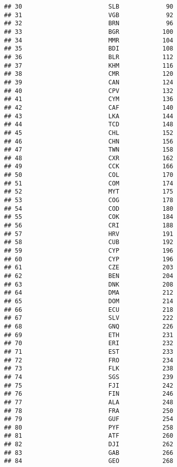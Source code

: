 \documentclass[
]{article}
\begin{document}
\begin{verbatim}
## 30                        SLB             90
## 31                        VGB             92
## 32                        BRN             96
## 33                        BGR            100
## 34                        MMR            104
## 35                        BDI            108
## 36                        BLR            112
## 37                        KHM            116
## 38                        CMR            120
## 39                        CAN            124
## 40                        CPV            132
## 41                        CYM            136
## 42                        CAF            140
## 43                        LKA            144
## 44                        TCD            148
## 45                        CHL            152
## 46                        CHN            156
## 47                        TWN            158
## 48                        CXR            162
## 49                        CCK            166
## 50                        COL            170
## 51                        COM            174
## 52                        MYT            175
## 53                        COG            178
## 54                        COD            180
## 55                        COK            184
## 56                        CRI            188
## 57                        HRV            191
## 58                        CUB            192
## 59                        CYP            196
## 60                        CYP            196
## 61                        CZE            203
## 62                        BEN            204
## 63                        DNK            208
## 64                        DMA            212
## 65                        DOM            214
## 66                        ECU            218
## 67                        SLV            222
## 68                        GNQ            226
## 69                        ETH            231
## 70                        ERI            232
## 71                        EST            233
## 72                        FRO            234
## 73                        FLK            238
## 74                        SGS            239
## 75                        FJI            242
## 76                        FIN            246
## 77                        ALA            248
## 78                        FRA            250
## 79                        GUF            254
## 80                        PYF            258
## 81                        ATF            260
## 82                        DJI            262
## 83                        GAB            266
## 84                        GEO            268

\end{verbatim}
\end{document}
